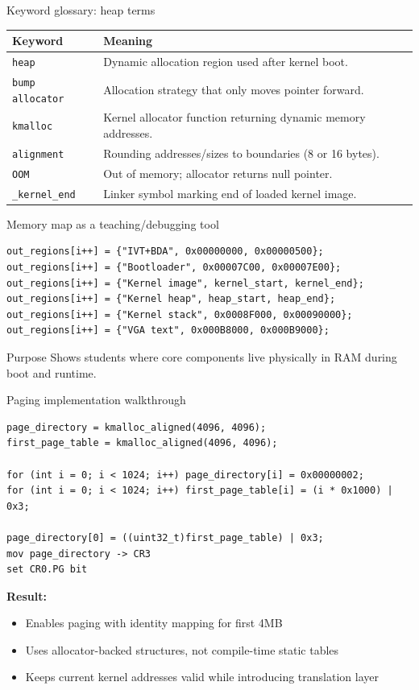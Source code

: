 \documentclass[aspectratio=169]{beamer}
\newcommand{\concept}[2]{%
  \begin{block}{#1}\smallskip #2\smallskip\end{block}\vspace{5pt}}
\begin{document}
\begin{frame}{Keyword glossary: heap terms}
  \small
  \begin{tabular}{@{}p{2.9cm}p{9.1cm}@{}}
    \toprule
    \textbf{Keyword} & \textbf{Meaning} \\
    \midrule
    \texttt{heap} & Dynamic allocation region used after kernel boot. \\
    \texttt{bump allocator} & Allocation strategy that only moves pointer forward. \\
    \texttt{kmalloc} & Kernel allocator function returning dynamic memory addresses. \\
    \texttt{alignment} & Rounding addresses/sizes to boundaries (8 or 16 bytes). \\
    \texttt{OOM} & Out of memory; allocator returns null pointer. \\
    \texttt{\_kernel\_end} & Linker symbol marking end of loaded kernel image. \\
    \bottomrule
  \end{tabular}
\end{frame}

\begin{frame}[fragile]{Memory map as a teaching/debugging tool}
\begin{lstlisting}[style=clang]
out_regions[i++] = {"IVT+BDA", 0x00000000, 0x00000500};
out_regions[i++] = {"Bootloader", 0x00007C00, 0x00007E00};
out_regions[i++] = {"Kernel image", kernel_start, kernel_end};
out_regions[i++] = {"Kernel heap", heap_start, heap_end};
out_regions[i++] = {"Kernel stack", 0x0008F000, 0x00090000};
out_regions[i++] = {"VGA text", 0x000B8000, 0x000B9000};
\end{lstlisting}
\concept{Purpose}{
  Shows students where core components live physically in RAM during boot and runtime.
}
\end{frame}

\begin{frame}[fragile]{Paging implementation walkthrough}
\begin{lstlisting}[style=clang]
page_directory = kmalloc_aligned(4096, 4096);
first_page_table = kmalloc_aligned(4096, 4096);

for (int i = 0; i < 1024; i++) page_directory[i] = 0x00000002;
for (int i = 0; i < 1024; i++) first_page_table[i] = (i * 0x1000) | 0x3;

page_directory[0] = ((uint32_t)first_page_table) | 0x3;
mov page_directory -> CR3
set CR0.PG bit
\end{lstlisting}
\textbf{Result:}
\begin{itemize}
  \item Enables paging with identity mapping for first 4MB
  \item Uses allocator-backed structures, not compile-time static tables
  \item Keeps current kernel addresses valid while introducing translation layer
\end{itemize}
\end{frame}
\end{document}
